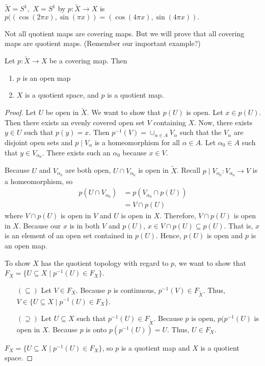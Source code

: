 \begin{example}
$\tilde{X}=S^1,$ $X=S^1$ by $p:\tilde{X} \rightarrow X$ is $p((\cos(2 \pi x), \sin(\pi x))=(\cos(4 \pi x), \sin(4 \pi x)).$  

\placeholder
\end{example}

Not all quotient maps are covering maps.  But we will prove that all covering maps are quotient maps.  (Remember our important example?)

\begin{theorem}  Let $p:\tilde{X}\rightarrow X$ be a covering map.  Then
\begin{enumerate}
\item  $p$ is an open map
\item $X$ is a quotient space, and $p$ is a quotient map.
\end{enumerate}
\end{theorem}

\begin{proof}  Let $U$ be open in $\tilde{X}$.  We want to show that $p(U)$ is open.  Let $x \in p(U).$  Then there exists an evenly covered open set $V$ containing $X$.  Now, there exists $y \in U$ such that $p(y)=x.$  Then $p^{-1}(V)=\cup_{\alpha \in A}V_{\alpha}$ such that the $V_{\alpha}$ are disjoint open sets and $p \mid V_{\alpha}$ is a homeomorphism for all $\alpha \in A$.  Let $\alpha_0 \in A$ such that $y \in V_{\alpha_0}$.  There exists such an $\alpha_0$ because $x \in V$.

Because $U$ and $V_{\alpha_0}$ are both open, $U\cap V_{\alpha_0}$ is open in $\widetilde{X}$. Recall $p\mid V_{\alpha_0}:V_{\alpha_0}\rightarrow V$ is a homeomorphism, so 
\begin{align*}
p(U\cap V_{\alpha_0})&=p\left(V_{\alpha_0}\cap p(U)\right)\\
&=V\cap p(U)
\end{align*}
where $V\cap p(U)$ is open in $V$ and $U$ is open in $X$. Therefore, $V\cap p(U)$ is open in $X$. Because our $x$ is in both $V$ and $p(U)$, $x\in V\cap p(U)\subseteq p(U)$. That is, $x$ is an element of an open set contained in $p(U)$. Hence, $p(U)$ is open and $p$ is an open map.
\item To show $X$ has the quotient topology with regard to $p$, we want to show that $F_X = \{U\subseteq X \mid p^{-1}(U)\in F_X\}$.

\begin{itemize}
\item[$(\subseteq)$] Let $V\in F_X$. Because $p$ is continuous, $p^{-1}(V)\in F_{\widetilde{X}}$. Thus, $V\in \{U\subseteq X \mid p^{-1}(U)\in F_X\}$.

\item[$(\supseteq)$] Let $U\subseteq X$ such that $p^{-1}(U)\in F_{\widetilde{X}}$. Because $p$ is open, $p(p^{-1}(U)$ is open in $X$. Because $p$ is onto $p(p^{-1}(U))=U$. Thus, $U\in F_X$.
\end{itemize}

$F_X = \{U\subseteq X \mid p^{-1}(U)\in F_X\}$, so $p$ is a quotient map and $X$ is a quotient space. 

\end{proof}

